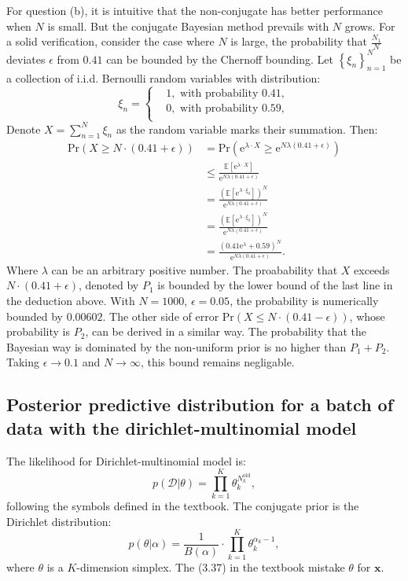 \documentclass[UTF8]{ctexart}
\begin{document}
For question (b), it is intuitive that the non-conjugate has better performance when $N$ is small.
But the conjugate Bayesian method prevails with $N$ grows. 
For a solid verification, consider the case where $N$ is large, the probability that $\frac{N_{1}}{N}$ deviates $\epsilon$ from $0.41$ can be bounded by the Chernoff bounding. 
Let $\left\{\xi_{n}\right\}_{n=1}^{N}$ be a collection of i.i.d. Bernoulli random variables with distribution:
$$
\xi_{n}=\left\{  
\begin{aligned}
&1,\text{ with probability 0.41},\\
&0,\text{ with probability 0.59},\\
\end{aligned}  
\right.  
$$
Denote $X=\sum_{n=1}^{N}\xi_{n}$ as the random variable marks their summation. 
Then:
$$
\begin{aligned}
\text{Pr}(X\geq N\cdot(0.41+\epsilon))&=\text{Pr}(\text{e}^{\lambda\cdot X}\geq \text{e}^{N\lambda(0.41+\epsilon)})\\
&\leq \frac{\mathbb{E}[\text{e}^{\lambda\cdot X}]}{\text{e}^{N\lambda(0.41+\epsilon)}}\\
&=\frac{\left(\mathbb{E}[\text{e}^{\lambda\cdot\xi_{0}}]\right)^{N}}{\text{e}^{N\lambda(0.41+\epsilon)}}\\
&=\frac{\left(\mathbb{E}[\text{e}^{\lambda\cdot\xi_{0}}]\right)^{N}}{\text{e}^{N\lambda(0.41+\epsilon)}}\\
&=\frac{\left(0.41\text{e}^{\lambda}+0.59\right)^{N}}{\text{e}^{N\lambda(0.41+\epsilon)}}.
\end{aligned}
$$
Where $\lambda$ can be an arbitrary positive number.
The proabability that $X$ exceeds $N\cdot(0.41+\epsilon)$, denoted by $P_{1}$ is bounded by the lower bound of the last line in the deduction above. 
With $N=1000$, $\epsilon=0.05$, the probability is numerically bounded by $0.00602$. 
The other side of error $\text{Pr}(X\leq N\cdot(0.41-\epsilon))$, whose probability is $P_{2}$, can be derived in a similar way. 
The probability that the Bayesian way is dominated by the non-uniform prior is no higher than $P_{1}+P_{2}$.
Taking $\epsilon\rightarrow 0.1$ and $N\rightarrow \infty$, this bound remains negligable. 

 

\subsection{Posterior predictive distribution for a batch of data with the dirichlet-multinomial model}
The likelihood for Dirichlet-multinomial model is:
$$p(\mathcal{D}|\theta)=\prod_{k=1}^{K}\theta_{k}^{N_{k}^{\text{old}}},$$
following the symbols defined in the textbook.
The conjugate prior is the Dirichlet distribution:
$$p(\theta|\alpha)=\frac{1}{B(\alpha)}\cdot\prod_{k=1}^{K}\theta_{k}^{\alpha_{k}-1},$$
where $\theta$ is a $K$-dimension simplex. 
The (3.37) in the textbook mistake $\theta$ for $\textbf{x}$. 
\end{document}
